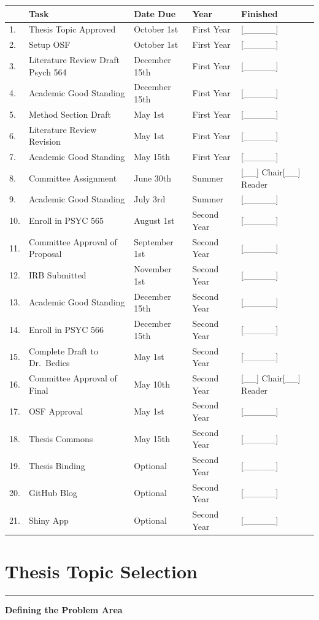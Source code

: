 \documentclass[openany]{book}
\begin{document}
\begin{longtable}[]{@{}lllll@{}}
\toprule
& Task & Date Due & Year & Finished\tabularnewline
\midrule
\endhead
1. & Thesis Topic Approved & October 1st & First Year & {[}\_\_\_\_\_{]}\tabularnewline
2. & Setup OSF & October 1st & First Year & {[}\_\_\_\_\_{]}\tabularnewline
3. & Literature Review Draft Psych 564 & December 15th & First Year & {[}\_\_\_\_\_{]}\tabularnewline
4. & Academic Good Standing & December 15th & First Year & {[}\_\_\_\_\_{]}\tabularnewline
5. & Method Section Draft & May 1st & First Year & {[}\_\_\_\_\_{]}\tabularnewline
6. & Literature Review Revision & May 1st & First Year & {[}\_\_\_\_\_{]}\tabularnewline
7. & Academic Good Standing & May 15th & First Year & {[}\_\_\_\_\_{]}\tabularnewline
8. & Committee Assignment & June 30th & Summer & {[}\_\_{]} Chair{[}\_\_{]} Reader\tabularnewline
9. & Academic Good Standing & July 3rd & Summer & {[}\_\_\_\_\_{]}\tabularnewline
10. & Enroll in PSYC 565 & August 1st & Second Year & {[}\_\_\_\_\_{]}\tabularnewline
11. & Committee Approval of Proposal & September 1st & Second Year & {[}\_\_\_\_\_{]}\tabularnewline
12. & IRB Submitted & November 1st & Second Year & {[}\_\_\_\_\_{]}\tabularnewline
13. & Academic Good Standing & December 15th & Second Year & {[}\_\_\_\_\_{]}\tabularnewline
14. & Enroll in PSYC 566 & December 15th & Second Year & {[}\_\_\_\_\_{]}\tabularnewline
15. & Complete Draft to Dr.~Bedics & May 1st & Second Year & {[}\_\_\_\_\_{]}\tabularnewline
16. & Committee Approval of Final & May 10th & Second Year & {[}\_\_{]} Chair{[}\_\_{]} Reader\tabularnewline
17. & OSF Approval & May 1st & Second Year & {[}\_\_\_\_\_{]}\tabularnewline
18. & Thesis Commons & May 15th & Second Year & {[}\_\_\_\_\_{]}\tabularnewline
19. & Thesis Binding & Optional & Second Year & {[}\_\_\_\_\_{]}\tabularnewline
20. & GitHub Blog & Optional & Second Year & {[}\_\_\_\_\_{]}\tabularnewline
21. & Shiny App & Optional & Second Year & {[}\_\_\_\_\_{]}\tabularnewline
\bottomrule
\end{longtable}

\hypertarget{thesis-topic-selection}{%
\section{Thesis Topic Selection}\label{thesis-topic-selection}}

\begin{center}\rule{0.5\linewidth}{0.5pt}\end{center}

\textbf{Defining the Problem Area}
\end{document}
